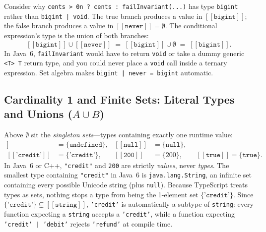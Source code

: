 Consider why \texttt{cents > 0n ? cents : failInvariant(...)} has type \texttt{bigint} rather than \texttt{bigint | void}. The true branch produces a value in $[\![ \texttt{bigint} ]\!]$; the false branch produces a value in $[\![ \texttt{never} ]\!] = \emptyset$. The conditional expression's type is the union of both branches:
\[
  [\![ \texttt{bigint} ]\!] \cup [\![ \texttt{never} ]\!] \;=\; [\![ \texttt{bigint} ]\!] \cup \emptyset \;=\; [\![ \texttt{bigint} ]\!].
\]
In Java~6, \texttt{failInvariant} would have to return \texttt{void} or take a dummy generic \texttt{<T> T} return type, and you could never place a \texttt{void} call inside a ternary expression. Set algebra makes \texttt{bigint | never = bigint} automatic.

\subsection{Cardinality 1 and Finite Sets: Literal Types and Unions ($A \cup B$)}

Above $\emptyset$ sit the \emph{singleton sets}---types containing exactly one runtime value:
\begin{align*}
  [\![ \texttt{undefined} ]\!] &= \{\texttt{undefined}\}, &
  [\![ \texttt{null} ]\!] &= \{\texttt{null}\}, \\
  [\![ \texttt{'credit'} ]\!] &= \{\texttt{'credit'}\}, &
  [\![ \texttt{200} ]\!] &= \{200\}, \qquad
  [\![ \texttt{true} ]\!] = \{\texttt{true}\}.
\end{align*}
In Java~6 or C++, \texttt{"credit"} and \texttt{200} are strictly \emph{values}, never \emph{types}. The smallest type containing \texttt{"credit"} in Java~6 is \texttt{java.lang.String}, an infinite set containing every possible Unicode string (plus \texttt{null}). Because TypeScript treats types as sets, nothing stops a type from being the 1-element set $\{\texttt{'credit'}\}$. Since $\{\texttt{'credit'}\} \subsetneq [\![ \texttt{string} ]\!]$, \texttt{'credit'} is automatically a subtype of \texttt{string}: every function expecting a \texttt{string} accepts a \texttt{'credit'}, while a function expecting \texttt{'credit' | 'debit'} rejects \texttt{'refund'} at compile time.

